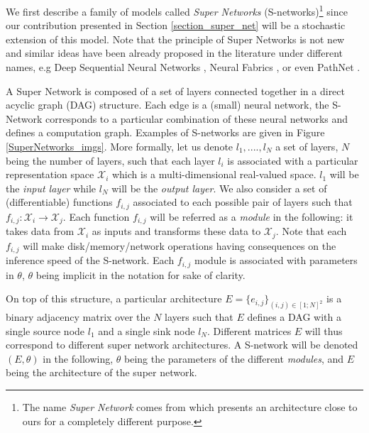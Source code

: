\documentclass[10pt,twocolumn,letterpaper]{article}
\begin{document}
We first describe a family of models called \textit{Super Networks} (S-networks)\footnote{The name \textit{Super Network} comes from \cite{DBLP:journals/corr/FernandoBBZHRPW17} which presents an architecture close to ours for a completely different purpose. } since our contribution presented in Section \ref{section_super_net} will be a stochastic extension of this model. Note that the principle of Super Networks is not new and similar ideas have been already proposed in the literature under different names, e.g Deep Sequential Neural Networks \cite{DBLP:journals/corr/DenoyerG14}, Neural Fabrics \cite{DBLP:journals/corr/SaxenaV16}, or even PathNet \cite{DBLP:journals/corr/FernandoBBZHRPW17}.

A Super Network is composed of a set of layers connected together in a direct acyclic graph (DAG) structure. Each edge is a (small) neural network, the S-Network corresponds to a particular combination of these neural networks and defines a computation graph. Examples of S-networks are given in Figure \ref{SuperNetworks_imgs}. More formally, let us denote $l_1,....,l_N$ a set of layers, $N$ being the number of layers, such that each layer $l_i$ is associated with a particular representation space $\mathcal{X}_i$ which is a  multi-dimensional real-valued space. $l_1$ will be the \textit{input layer} while $l_N$ will be the \textit{output layer}. We also consider a set of (differentiable) functions $f_{i,j}$ associated to each possible pair of layers such that $f_{i,j}: \mathcal{X}_i\rightarrow \mathcal{X}_j$. Each function $f_{i,j}$ will be referred as a \textit{module} in the following: it takes data from $\mathcal{X}_i$ as inputs and transforms these data to  $\mathcal{X}_j$. Note that each $f_{i,j}$ will make disk/memory/network operations having consequences on the inference speed of the S-network. Each $f_{i,j}$ module is associated with parameters in $\theta$, $\theta$ being implicit in the notation for sake of clarity.

On top of this structure, a particular architecture $E=\{e_{i,j}\}_{(i,j) \in [1;N]^2}$ is a binary adjacency matrix over the $N$ layers such that $E$ defines a DAG with a single source node $l_1$ and a single sink node $l_N$. Different matrices $E$ will thus correspond to different super network architectures. A S-network will be denoted $(E,\theta)$ in the following, $\theta$ being the parameters of the different \textit{modules}, and $E$ being the architecture of the super network.
\end{document}
